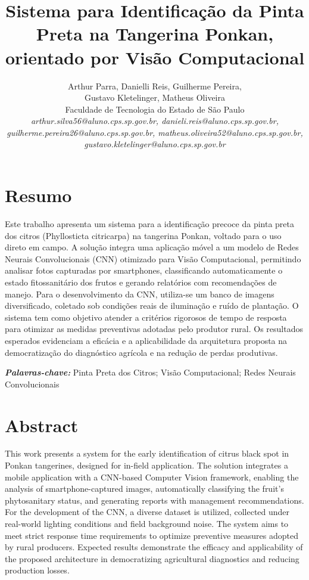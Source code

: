 \documentclass[11pt,a4paper]{article}
\title{\vspace{0.6cm}\textbf{\Large Sistema para Identificação da Pinta Preta na Tangerina Ponkan, orientado por Visão Computacional}}
\author{
    Arthur Parra, Danielli Reis, Guilherme Pereira, \\ Gustavo Kletelinger, Matheus Oliveira \\[0.3cm]
    \small
    Faculdade de Tecnologia do Estado de São Paulo \\[0.2cm]
    \textit{arthur.silva56@aluno.cps.sp.gov.br, danieli.reis@aluno.cps.sp.gov.br,}\\ \textit{guilherme.pereira26@aluno.cps.sp.gov.br, matheus.oliveira52@aluno.cps.sp.gov.br,}\\ \textit{gustavo.kletelinger@aluno.cps.sp.gov.br}
}
\date{}
\begin{document}
\pagestyle{fancy}

\maketitle
\thispagestyle{fancy}

\section*{Resumo}

Este trabalho apresenta um sistema para a identificação precoce da pinta preta dos citros (Phyllosticta citricarpa)  na tangerina Ponkan, voltado para o uso direto em campo. A solução integra uma aplicação móvel a um modelo de Redes Neurais Convolucionais (CNN) otimizado para Visão Computacional, permitindo analisar fotos capturadas por smartphones, classificando automaticamente o estado fitossanitário dos frutos e gerando relatórios com recomendações de manejo. Para o desenvolvimento da CNN, utiliza-se um banco de imagens diversificado, coletado sob condições reais de iluminação e ruído de plantação. O sistema tem como objetivo atender a critérios rigorosos de tempo de resposta para otimizar as medidas preventivas adotadas pelo produtor rural. Os resultados esperados evidenciam a eficácia e a aplicabilidade da arquitetura proposta na democratização do diagnóstico agrícola e na redução de perdas produtivas.

\vspace{0.3cm}
\noindent\textit{\textbf{Palavras-chave:}} Pinta Preta dos Citros; Visão Computacional; Redes Neurais Convolucionais

\section*{Abstract}

This work presents a system for the early identification of citrus black spot in Ponkan tangerines, designed for in-field application. The solution integrates a mobile application with a CNN-based Computer Vision framework, enabling the analysis of smartphone-captured images, automatically classifying the fruit's phytosanitary status, and generating reports with management recommendations. For the development of the CNN, a diverse dataset is utilized, collected under real-world lighting conditions and field background noise. The system aims to meet strict response time requirements to optimize preventive measures adopted by rural producers. Expected results demonstrate the efficacy and applicability of the proposed architecture in democratizing agricultural diagnostics and reducing production losses.
\end{document}
